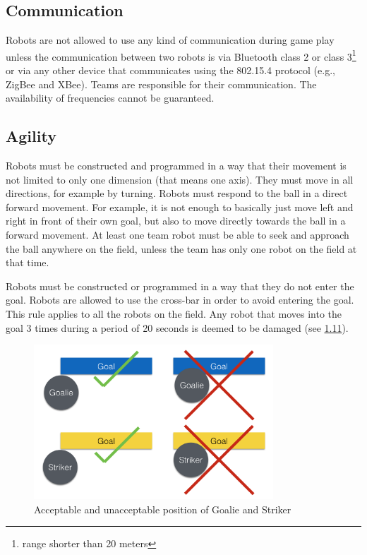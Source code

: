 \documentclass{article}
\begin{document}
\subsection{ Communication \label{ref-022}}

Robots are not allowed to use any kind of communication during game play unless
the communication between two robots is via Bluetooth class 2 or class
3\footnote{range shorter than 20 meters} or via any other device that
communicates using the 802.15.4 protocol (e.g., ZigBee and XBee). Teams are
responsible for their communication. The availability of frequencies cannot be
guaranteed.

\subsection{ Agility \label{ref-023}}

Robots must be constructed and programmed in a way that their movement is not
limited to only one dimension (that means one axis). They must move in all
directions, for example by turning. Robots must respond to the ball in a direct
forward movement. For example, it is not enough to basically just move left and
right in front of their own goal, but also to move directly towards the ball in
a forward movement. At least one team robot must be able to seek and approach
the ball anywhere on the field, unless the team has only one robot on the field
at that time.

Robots must be constructed or programmed in a way that they do not enter the
goal. Robots are allowed to use the cross-bar in order to avoid entering the
goal. This rule applies to all the robots on the field. Any robot that moves
into the goal 3 times during a period of 20 seconds is deemed to be damaged
(see \hyperref[ref-012]{1.11}).

\begin{figure}[H]
    \centering
    \includegraphics[width=0.8\textwidth]{media/image3.png}
    \caption{Acceptable and unacceptable position of Goalie and Striker}
    \label{fig:robot_in_goal}
\end{figure}
\end{document}
